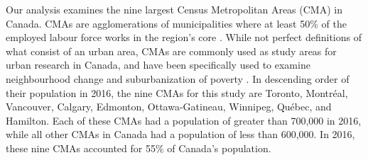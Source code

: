 Our analysis examines the nine largest Census Metropolitan Areas (CMA) in Canada. CMAs are agglomerations of municipalities where at least 50\% of the employed labour force works in the region's core \cite{statistics_canada_dictionary_2016-1}. While not perfect definitions of what consist of an urban area, CMAs are commonly used as study areas for urban research in Canada, and have been specifically used to examine neighbourhood change \cite{walks_income_2013,grant_changing_2020} and suburbanization of poverty \cite{ades_are_2012,allen_suburbanization_2021}. In descending order of their population in 2016, the nine CMAs for this study are Toronto, Montréal, Vancouver, Calgary, Edmonton, Ottawa-Gatineau, Winnipeg, Québec, and Hamilton. Each of these CMAs had a population of greater than 700,000 in 2016, while all other CMAs in Canada had a population of less than 600,000. In 2016, these nine CMAs accounted for 55\% of Canada's population.








